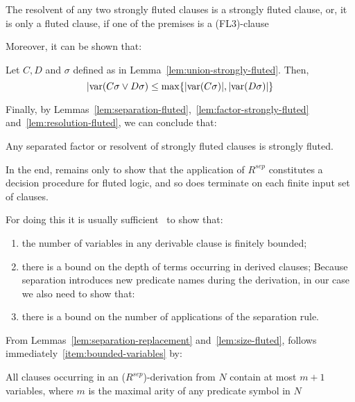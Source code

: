 \begin{lemma}\label{lem:resolution-fluted}
  The resolvent of any two strongly fluted clauses is a strongly fluted clause, or, it is only a fluted clause, if one of the premises is a (FL3)-clause
\end{lemma}

Moreover, it can be shown that:

\begin{lemma}\label{lem:size-fluted}
  Let \(C,D\) and \(\sigma\) defined as in Lemma~\ref{lem:union-strongly-fluted}. Then,
  \[ |\text{var} (C\sigma \lor D\sigma) \leq \max\{ |\text{var} (C\sigma)|,|\text{var} (D\sigma)|\}\]
\end{lemma}
Finally, by Lemmas~\ref{lem:separation-fluted},~\ref{lem:factor-strongly-fluted} and~\ref{lem:resolution-fluted}, we can conclude that:
\begin{lemma}
  Any separated factor or resolvent of strongly fluted clauses is strongly fluted.
\end{lemma}

In the end, remains only to show that the application of \(R^{sep}\) constitutes a decision procedure for fluted logic, and so does terminate on each finite input set of clauses.

For doing this it is usually sufficient~\cite{joyner1976resolution} to show that:
\begin{enumerate}[label= (\roman*)]
  \item\label{item:bounded-variables} the number of variables in any derivable clause is finitely bounded;
  \item\label{item:bounded-depth} there is a bound on the depth of terms occurring in derived clauses;
  Because separation introduces new predicate names during the derivation, in our case we also need to show that:
  \item\label{item:bounded-separation} there is a bound on the number of applications of the separation rule.
\end{enumerate}

From Lemmas~\ref{lem:separation-replacement} and~\ref{lem:size-fluted}, follows immediately~\ref{item:bounded-variables} by:
\begin{lemma}\label{lem:bounded-variables}
  All clauses occurring in an (\(R^{sep}\))-derivation from \(N\) contain at most \(m+1\) variables, where \(m\) is the maximal arity of any predicate symbol in \(N\)
\end{lemma}

